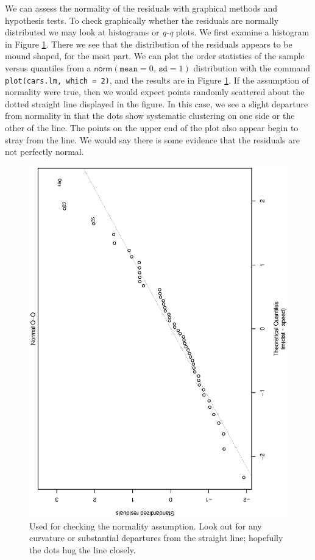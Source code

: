 \documentclass[captions=tableheading]{scrbook}
\begin{document}
We can assess the normality of the residuals with graphical methods and hypothesis tests. To check graphically whether the residuals are normally distributed we may look at histograms or \emph{q-q} plots. We first examine a histogram in Figure \ref{fig-Normal-q-q-plot-cars}. There we see that the distribution of the residuals appears to be mound shaped, for the most part. We can plot the order statistics of the sample versus quantiles from a \(\mathsf{norm}(\mathtt{mean}=0,\,\mathtt{sd}=1)\) distribution with the command \texttt{plot(cars.lm, which = 2)}, and the results are in Figure \ref{fig-Normal-q-q-plot-cars}. If the assumption of normality were true, then we would expect points randomly scattered about the dotted straight line displayed in the figure. In this case, we see a slight departure from normality in that the dots show systematic clustering on one side or the other of the line. The points on the upper end of the plot also appear begin to stray from the line. We would say there is some evidence that the residuals are not perfectly normal. 

\begin{figure}[th]
  \includegraphics[angle=270, totalheight=4in]{ps/slr/Normal-q-q-plot-cars.ps}
  \caption[Normal q-q plot of the residuals for the \texttt{cars} data]{\small Used for checking the normality assumption. Look out for
any curvature or substantial departures from the straight line; hopefully
the dots hug the line closely.}
  \label{fig-Normal-q-q-plot-cars}
\end{figure}
\end{document}
